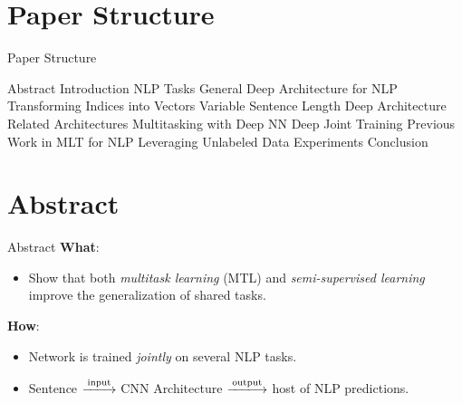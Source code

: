 \documentclass[handout]{beamer} %
\begin{document}
  \section{Paper Structure}
  \begin{frame}{Paper Structure}
      \begin{outline}[enumerate]
        \1[] Abstract
        \1 Introduction
        \1 NLP Tasks
        \1 General Deep Architecture for NLP
          \2 Transforming Indices into Vectors
          \2 Variable Sentence Length
          \2 Deep Architecture
          \2 Related Architectures
        \1 Multitasking with Deep NN
          \2 Deep Joint Training
          \2 Previous Work in MLT for NLP
        \1 Leveraging Unlabeled Data
        \1 Experiments
        \1 Conclusion
      \end{outline}
  \end{frame}

  \section{Abstract}
  \begin{frame}{Abstract}
      \textbf{What}:
      \begin{itemize}
          \item Show that both \textit{multitask learning} (MTL) and
              \textit{semi-supervised learning} improve the generalization of
              shared tasks.
      \end{itemize}
      \textbf{How}:
      \begin{itemize}
          \item Network is trained \textit{jointly} on several NLP tasks.
          \item Sentence $\xlongrightarrow{\text{input}}$ CNN Architecture
              $\xlongrightarrow{\text{output}}$ host of NLP predictions.

      \end{itemize}
  \end{frame}
\end{document}
